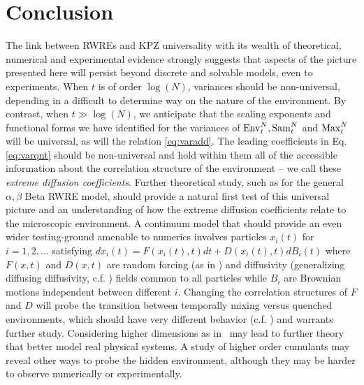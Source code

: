 \section{Conclusion}
The link between RWREs and KPZ universality with its wealth of theoretical, numerical and experimental evidence strongly suggests that aspects of the picture presented here will persist beyond discrete and solvable models, even to experiments. When $t$ is of order $\log(N)$, variances should be non-universal, depending in a difficult to determine way on the nature of the environment. By contrast, when $t\gg\log(N)$, we anticipate that the scaling exponents and functional forms we have identified for the variances of $\mathrm{Env}^{N}_t,\mathrm{Sam}^{N}_t$ and $\mathrm{Max}^{N}_t$ will be universal, as will the relation \eqref{eq:varadd}. The leading coefficients  in Eq. \eqref{eq:varqnt} should be non-universal and hold within them all of the accessible information about the correlation structure of the environment -- we call these {\it extreme diffusion coefficients}. Further theoretical study, such as for the general $\alpha,\beta$ Beta RWRE model, should provide a natural first test of this universal picture and an understanding of how the extreme diffusion coefficients relate to the microscopic environment. A continuum model that should provide an even wider testing-ground amenable to numerics involves particles $x_i(t)$ for $i=1,2,\ldots$ satisfying $dx_i(t) = F(x_i(t),t)dt + D(x_i(t),t) dB_i(t)$ where $F(x,t)$ and $D(x,t)$ are random forcing (as in \cite{ledoussalDiffusionTimedependentRandom2017}) and diffusivity (generalizing diffusing diffusivity, c.f. \cite{PhysRevX.7.021002}) fields common to all particles while $B_i$ are  Brownian motions independent between different $i$. Changing the correlation structures of $F$ and $D$ will probe the transition between temporally mixing versus quenched environments, which should have very different behavior (c.f. \cite{PhysRevLett.61.500,PhysRevLett.62.3097}) and warrants further study. Considering higher dimensions as in~\cite{ledoussalDiffusionTimedependentRandom2017} may lead to further theory that better model real physical systems. A study of higher order cumulants may reveal other ways to probe the hidden environment, although they may be harder to observe numerically or experimentally.

